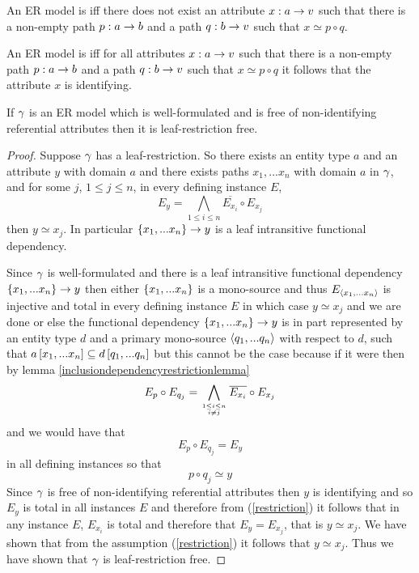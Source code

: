 \begin{definition} 
An  ER model is  iff 
there does not exist an attribute $x:a \rightarrow v$
such that there is a non-empty  path $p:a \rightarrow b$ and a path $q:b \rightarrow v$ such that
$x \simeq p \circ q$.
\end{definition}

\begin{definition} 
An  ER model is  iff 
for all attributes $x:a \rightarrow v$
such that there is a non-empty  path $p:a \rightarrow b$ and a path $q:b \rightarrow v$ such that
$x \simeq p \circ q$ it follows that the attribute $x$ is identifying.
\end{definition}

\begin{lemma}
If $\gamma$ is an ER model which is well-formulated and is free of non-identifying referential attributes
then it is leaf-restriction free.
\end{lemma}
\begin{proof}
Suppose $\gamma$ has a leaf-restriction. So there exists an
entity type $a$ and an attribute $y$ with domain $a$ and there 
exists paths $x_1,...x_n$   with domain
$a$ in $\gamma$,  and for some $j$, $1 \leq j \leq n$, in every defining instance $E$, 
\begin{equation}
\label {restriction} 
E_y = \bigwedge_{1 \leq i \leq n}{\overline{E_{x_i}}} \circ E_{x_j}
\end{equation}
then $y \simeq x_j$. In particular
$\left\{x_1,...x_n\right\} \rightarrow y$ is a leaf intransitive functional dependency. 

Since $\gamma$ is well-formulated  and there is a leaf intransitive functional dependency $\left\{x_1,...x_n\right\} \rightarrow y$ then either $\left\{x_1,...x_n\right\}$ is a mono-source and thus $E_{\langle x_1,...x_n\rangle}$ is injective and total in every defining instance $E$  in which case $y \simeq x_j$  and we are done  or else the functional dependency $\left\{x_1,...x_n\right\} \rightarrow y$   is in part represented by  an entity type $d$ and a primary mono-source $\langle q_1,...q_n\rangle$ with respect to $d$, such that $a\left[x_1,...x_n\right]\subseteq d\left[q_1,...q_n\right]$ but this cannot be the case because if it were then by lemma \ref{inclusiondependencyrestrictionlemma}
$$E_p \circ E_{q_j} = \bigwedge\limits_{\genfrac{}{}{0pt}{}{1 \leq i \leq n}{ i \neq j}}{\overline{E_{x_i}}}\circ E_{x_j}$$
and we would have that
$$E_p \circ E_{q_j} = E_y$$
in all defining instances so that
$$p \circ q_j \simeq y$$
Since $\gamma$ is free of non-identifying referential attributes then $y$ is identifying and so $E_y$ is total in all instances $E$ and therefore 
 from (\ref{restriction}) it follows that in any instance $E$, $E_{x_i}$ is total and therefore that $E_y =E_{x_j}$, that is 
$y \simeq x_j$. We have shown that from the assumption (\ref{restriction}) it follows that $y \simeq x_j$. Thus we have shown that $\gamma$ is leaf-restriction free.
\end{proof}

